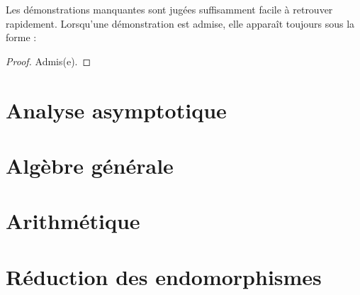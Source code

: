 \documentclass{report}
\begin{document}
Les démonstrations manquantes sont jugées suffisamment facile à retrouver rapidement. Lorsqu'une démonstration est admise, elle apparaît toujours sous la forme :

\begin{proof}
    Admis(e).
\end{proof}

\newpage

\pagestyle{main}

\chapter{Analyse asymptotique}







\chapter{Algèbre générale}



\chapter{Arithmétique}



\chapter{Réduction des endomorphismes}


\end{document}
